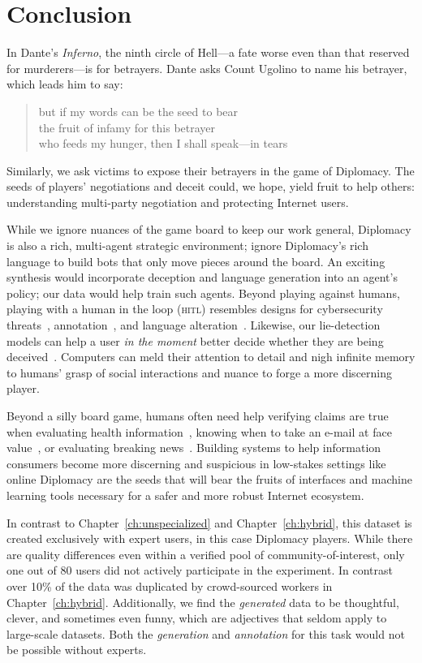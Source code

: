 \section{Conclusion}
\label{sec:conclusion}

In Dante's \textit{Inferno}, the ninth circle of Hell---a fate worse
even than that reserved for murderers---is for betrayers.
%
Dante asks Count Ugolino to name his betrayer, which leads him to say:
\begin{quote}
  but if my words can be the seed to bear \\
  the fruit of infamy for this betrayer \\
  who feeds my hunger, then I shall speak---in tears~\citep[Canto XXXIII]{dante-95}
\end{quote}
Similarly, we ask victims to expose their betrayers in the game of
Diplomacy.
%
The seeds of players' negotiations and deceit could, we hope, yield fruit to help
others: understanding multi-party negotiation and protecting Internet
users.

While we ignore nuances of the game board to keep our work general, 
Diplomacy is also a rich, multi-agent strategic environment;
\citep{paquette-19} ignore Diplomacy's rich language to build bots
that only move pieces around the board.
%
An exciting synthesis would incorporate deception and language
generation into an agent's policy; our data would help train such agents.
%
Beyond playing against humans, playing with a human in the loop
(\textsc{hitl}) resembles designs for cybersecurity
threats~\citep{cranor2008framework},
annotation~\citep{branson2010visual}, and language
alteration~\citep{wallace2019trick}.
%
Likewise, our lie-detection models can help a user \emph{in the
  moment} better decide whether they are being deceived~\citep{lai-20}.
%
Computers can meld their attention to detail and nigh infinite memory to
humans' grasp of social interactions and nuance to forge a more
discerning player.

Beyond a silly board game, humans often need help verifying claims are
true when evaluating health information~\citep{xie-09}, knowing when to
take an e-mail at face value~\citep{jagatic-07}, or evaluating breaking
news~\citep{hassan-17}.
%
Building systems to help information consumers become more discerning
and suspicious in low-stakes settings like online Diplomacy are the
seeds that will bear the fruits of interfaces and machine learning
tools necessary for a safer and more robust Internet ecosystem.

In contrast to Chapter~\ref{ch:unspecialized} and Chapter~\ref{ch:hybrid}, this dataset is created exclusively with expert users, in this case Diplomacy players.  
%
While there are quality differences even within a verified pool of community-of-interest, only one out of 80 users did not actively participate in the experiment.  
%
In contrast over 10\% of the data was duplicated by crowd-sourced workers in Chapter~\ref{ch:hybrid}.
%
Additionally, we find the \textit{generated} data to be thoughtful, clever, and sometimes even funny, which are adjectives that seldom apply to large-scale \nlp{} datasets.  
%
Both the \textit{generation} and \textit{annotation} for this task would not be possible without experts.  

